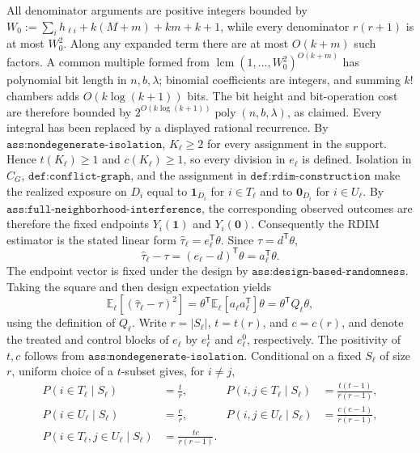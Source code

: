 All denominator arguments are positive integers bounded by \(W_0:=\sum_i h_{\ell i}+k(M+m)+km+k+1\), while every denominator \(r(r+1)\) is at most \(W_0^2\).  Along any expanded term there are at most \(O(k+m)\) such factors.  A common multiple formed from \(\operatorname{lcm}(1,\ldots,W_0^2)^{O(k+m)}\) has polynomial bit length in \(n,b,\lambda\); binomial coefficients are integers, and summing \(k!\) chambers adds \(O(k\log(k+1))\) bits.  The bit height and bit-operation cost are therefore bounded by \(2^{O(k\log(k+1))}\operatorname{poly}(n,b,\lambda)\), as claimed.  Every integral has been replaced by a displayed rational recurrence.
By \(\texttt{ass:nondegenerate-isolation}\), \(K_\ell\ge2\) for every assignment in the support.  Hence \(t(K_\ell)\ge1\) and \(c(K_\ell)\ge1\), so every division in \(e_\ell\) is defined.  Isolation in \(C_G\), \(\texttt{def:conflict-graph}\), and the assignment in \(\texttt{def:rdim-construction}\) make the realized exposure on \(D_i\) equal to \(\mathbf 1_{D_i}\) for \(i\in T_\ell\) and to \(\mathbf 0_{D_i}\) for \(i\in U_\ell\).  By \(\texttt{ass:full-neighborhood-interference}\), the corresponding observed outcomes are therefore the fixed endpoints \(Y_i(\mathbf 1)\) and \(Y_i(\mathbf 0)\).  Consequently the RDIM estimator is the stated linear form \(\widehat\tau_\ell=e_\ell^{\mathsf T}\theta\).  Since \(\tau=d^{\mathsf T}\theta\),
\[
 \widehat\tau_\ell-\tau=(e_\ell-d)^{\mathsf T}\theta=a_\ell^{\mathsf T}\theta.
\]
The endpoint vector is fixed under the design by \(\texttt{ass:design-based-randomness}\).  Taking the square and then design expectation yields
\[
 \mathbb E_\ell[(\widehat\tau_\ell-\tau)^2]
 =\theta^{\mathsf T}\mathbb E_\ell[a_\ell a_\ell^{\mathsf T}]\theta
 =\theta^{\mathsf T}Q_\ell\theta,
\]
using the definition of \(Q_\ell\).
Write \(r=|S_\ell|\), \(t=t(r)\), and \(c=c(r)\), and denote the treated and control blocks of \(e_\ell\) by \(e_\ell^1\) and \(e_\ell^0\), respectively.  The positivity of \(t,c\) follows from \(\texttt{ass:nondegenerate-isolation}\).  Conditional on a fixed \(S_\ell\) of size \(r\), uniform choice of a \(t\)-subset gives, for \(i\ne j\),
\[
 \begin{aligned}
 P(i\in T_\ell\mid S_\ell)&=\frac tr,&
 P(i,j\in T_\ell\mid S_\ell)&=\frac{t(t-1)}{r(r-1)},\\
 P(i\in U_\ell\mid S_\ell)&=\frac cr,&
 P(i,j\in U_\ell\mid S_\ell)&=\frac{c(c-1)}{r(r-1)},\\
 P(i\in T_\ell,j\in U_\ell\mid S_\ell)&=\frac{tc}{r(r-1)}.
 \end{aligned}
\]
